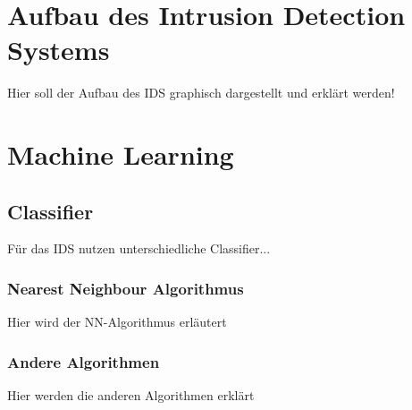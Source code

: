 \documentclass[main.tex]{subfiles}
\begin{document}
\section{Aufbau des Intrusion Detection Systems}

Hier soll der Aufbau des IDS graphisch dargestellt und erklärt werden!

\section{Machine Learning}
\subsection{Classifier}
Für das IDS nutzen unterschiedliche Classifier... 

\subsubsection{Nearest Neighbour Algorithmus}
Hier wird der NN-Algorithmus erläutert

\subsubsection{Andere Algorithmen}
Hier werden die anderen Algorithmen erklärt
\end{document}
